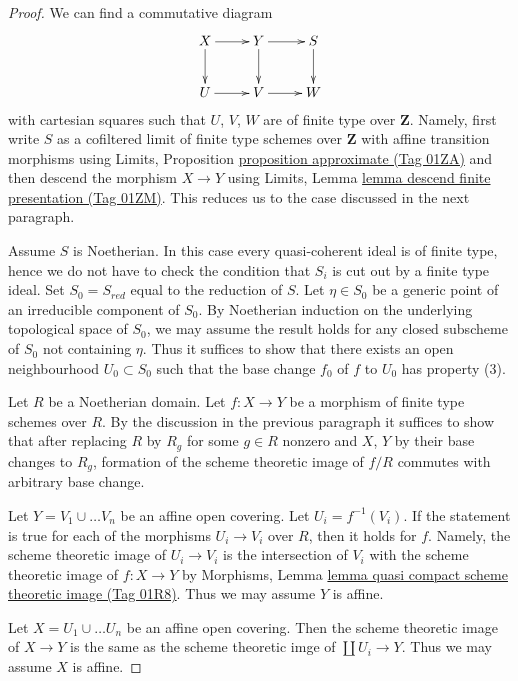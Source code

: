 \documentclass{amsart}
\theoremstyle{plain}
\theoremstyle{definition}
\theoremstyle{remark}
\numberwithin{equation}{subsection}
\begin{document}
\begin{proof}
We can find a commutative diagram
$$
\xymatrix{
X \ar[d] \ar[r] & Y \ar[d] \ar[r] & S \ar[d] \\
U \ar[r] & V \ar[r] & W
}
$$
with cartesian squares such that $U$, $V$, $W$
are of finite type over $\mathbf{Z}$. Namely, first write $S$
as a cofiltered limit of finite type schemes over $\mathbf{Z}$
with affine transition morphisms
using Limits, Proposition \href{https://stacks.math.columbia.edu/tag/01ZA}{proposition approximate (Tag 01ZA)}
and then descend the morphism $X \to Y$ using
Limits, Lemma \href{https://stacks.math.columbia.edu/tag/01ZM}{lemma descend finite presentation (Tag 01ZM)}.
This reduces us to the case discussed in the next paragraph.

\medskip\noindent
Assume $S$ is Noetherian.  In this case every quasi-coherent ideal
is of finite type, hence we do not have to check the condition that
$S_i$ is cut out by a finite type ideal. Set $S_0 = S_{red}$ equal
to the reduction of $S$. Let $\eta \in S_0$ be a generic point
of an irreducible component of $S_0$. By Noetherian induction on
the underlying topological space of $S_0$, we may assume the result
holds for any closed subscheme of $S_0$ not containing $\eta$.
Thus it suffices to show that there exists an open neighbourhood
$U_0 \subset S_0$ such that the base change $f_0$ of $f$ to $U_0$
has property (3).

\medskip\noindent
Let $R$ be a Noetherian domain. Let $f : X \to Y$ be a morphism
of finite type schemes over $R$. By the discussion in the previous paragraph
it suffices to show that after replacing $R$ by $R_g$ for some $g \in R$
nonzero and $X$, $Y$ by their base changes to $R_g$,
formation of the scheme theoretic image of $f/R$ commutes
with arbitrary base change.

\medskip\noindent
Let $Y = V_1 \cup \ldots V_n$ be an affine open covering.
Let $U_i = f^{-1}(V_i)$. If the statement is true for each of the
morphisms $U_i \to V_i$ over $R$, then it holds for $f$.
Namely, the scheme theoretic image of $U_i \to V_i$
is the intersection of $V_i$ with the scheme theoretic
image of $f : X \to Y$ by Morphisms, Lemma
\href{https://stacks.math.columbia.edu/tag/01R8}{lemma quasi compact scheme theoretic image (Tag 01R8)}.
Thus we may assume $Y$ is affine.

\medskip\noindent
Let $X = U_1 \cup \ldots U_n$ be an affine open covering.
Then the scheme theoretic image of $X \to Y$ is the same as
the scheme theoretic imge of $\coprod U_i \to Y$.
Thus we may assume $X$ is affine.


\end{proof}
\end{document}
